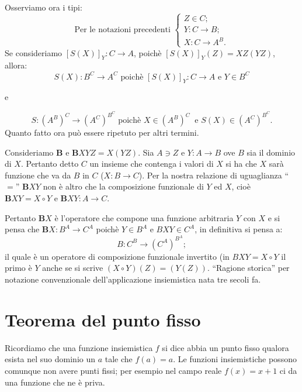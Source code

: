 \documentclass{book}
\newcommand*{\bb}{\mathbf{B}}    %
\begin{document}
\vspace{0.3 cm}
Osserviamo ora i tipi:
\begin{displaymath}
\text{Per le notazioni precedenti } \left\{ \begin{array}{l}
Z \in C; \\
Y: C \longrightarrow B; \\
X: C \longrightarrow A^B.
\end{array}\right.
\end{displaymath}
Se consideriamo $[S(X)]_{Y}: C \longrightarrow A$, poich\`e $[S(X)]_{Y}(Z) =
XZ(YZ)$, allora:
\[
S(X): B^C \longrightarrow A^C \text{ \ poich\`e\ }[S(X)]_{Y}: C 
\longrightarrow A \text{ \  e\ } Y \in B^C
\]
\begin{center}e\end{center} 
\[
S: (A^B)^C \longrightarrow (A^C)^{B^C}\text{ \ poich\`e\ }X \in (A^B)^C\
\text{ e\ }S(X) \in (A^C)^{B^C}.
\]
Quanto fatto ora pu\`o essere ripetuto per altri termini.

Consideriamo $\bb$ e $\bb XYZ = X(YZ)$. Sia $A \ni Z$ e $Y\colon A
\to B$ ove $B$ sia il dominio di $X$. Pertanto detto $C$ un
insieme che contenga i valori di $X$ si ha che $X$ sar\`a funzione che va da
$B$ in $C$ ($X\colon B \to C$). Per la nostra relazione di uguaglianza
``$=$'' $\bb XY$ non \`e altro che la composizione funzionale di $Y$ ed $X$, 
cio\`e $\bb XY = X \circ Y$ e $\bb XY \colon A \to C$.

Pertanto $\bb X$ \`e l'operatore che compone una funzione arbitraria $Y$ con 
$X$ e si pensa che $\bb X\colon B^A \to C^A$ poich\`e $Y \in B^A$ e $BXY \in
C^A$, in definitiva si pensa a:
\begin{displaymath}
B: C^B \longrightarrow (C^A)^{B^A};
\end{displaymath}
il quale \`e un operatore di composizione funzionale invertito (in $BXY =
 X \circ Y$ il primo \`e $Y$ anche se si scrive $(X \circ Y)(Z) = (Y(Z))$.
 ``Ragione storica'' per notazione convenzionale dell'applicazione 
insiemistica nata tre secoli fa.

\section{Teorema del punto fisso}
Ricordiamo che una funzione insiemistica  $f$ si dice abbia un punto fisso
qualora esista nel suo dominio un $a$ tale che $f(a) = a$.
Le funzioni insiemistiche possono comunque non avere punti fissi; per esempio
nel campo reale $f(x) = x + 1$ ci da una funzione che ne \`e priva.
\end{document}
